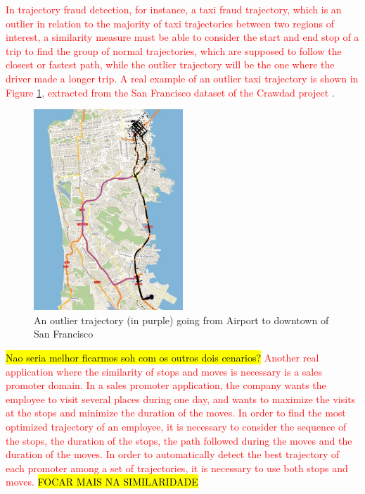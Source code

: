 \documentclass[12pt]{article}
\begin{document}
 \textcolor{red}{In trajectory fraud detection, for instance, a taxi fraud trajectory, which is an outlier in relation to the majority of taxi trajectories between two regions of interest, a similarity measure must be able to consider the start and end stop of a trip to find the group of normal trajectories, which are supposed to follow the closest or fastest path, while the outlier trajectory will be the one where the driver made a longer trip. A real example of an outlier taxi trajectory is shown in Figure \ref{fig:crawdad_outlier}, extracted from the San Francisco dataset of the Crawdad project} \citep{epfl-mobility-20090224}.
 
\begin{figure}[h]
\centering
\includegraphics[width=0.5\textwidth]{Images/CRAWDAD-Outlier.jpg}
\caption{\label{fig:crawdad_outlier} An outlier trajectory (in purple) going from Airport to downtown of San Francisco}
\end{figure}

\hl{Nao seria melhor ficarmos soh com os outros dois cenarios?}
\textcolor{red}{Another real application where the similarity of stops and moves is necessary is a sales promoter domain. In a sales promoter application, the company wants the employee to visit several places during one day, and wants to maximize the visits at the stops and minimize the duration of the moves. In order to find the most optimized trajectory of an employee, it is necessary to consider the sequence of the stops, the duration of the stops, the path followed during the moves and the duration of the moves. In order to automatically detect the best trajectory of each promoter among a set of trajectories, it is necessary to use both stops and moves.} \hl{FOCAR MAIS NA SIMILARIDADE}
 
\end{document}
